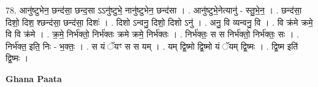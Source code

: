 \documentclass[17pt]{extarticle}
\begin{document}
78. आनु॑ष्टुभेन॒ छन्द॑सा॒ छन्द॒सा ऽऽनु॑ष्टुभे॒ नानु॑ष्टुभेन॒ छन्द॑सा । . आनु॑ष्टुभे॒नेत्यानु॑ - स्तु॒भे॒न॒ । . छन्द॑सा॒ दिशो॒ दिश॒ श्छन्द॑सा॒ छन्द॑सा॒ दिशः॑ । . दिशो ऽन्वनु॒ दिशो॒ दिशो ऽनु॑ । . अनु॒ वि व्यन्वनु॒ वि । . वि क्र॑मे क्रमे॒ वि वि क्र॑मे । . क्र॒मे॒ निर्भ॑क्तो॒ निर्भ॑क्तः क्रमे क्रमे॒ निर्भ॑क्तः । . निर्भ॑क्तः॒ स स निर्भ॑क्तो॒ निर्भ॑क्तः॒ सः । . निर्भ॑क्त॒ इति॒ निः - भ॒क्तः॒ । . स यं ॅयꣳ स स यम् । . यम् द्वि॒ष्मो द्वि॒ष्मो यं ॅयम् द्वि॒ष्मः । . द्वि॒ष्म इति॑ द्वि॒ष्मः । \newline

\textbf{Ghana Paata } \newline
\end{document}
